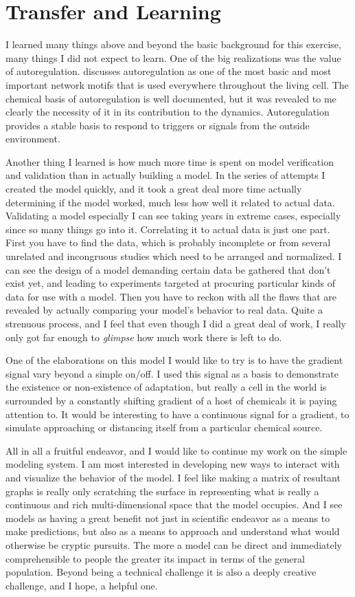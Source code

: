 \documentclass[12pt]{article}
\begin{document}
\section{Transfer and Learning}

I learned many things above and beyond the basic background for this exercise, many things I did not expect to learn.  One of the big realizations was the value of autoregulation.  \cite{Alon} discusses autoregulation as one of the most basic and most important network motifs that is used everywhere throughout the living cell.  The chemical basis of autoregulation is well documented, but it was revealed to me clearly the necessity of it in its contribution to the dynamics.  Autoregulation provides a stable basis to respond to triggers or signals from the outside environment.  

Another thing I learned is how much more time is spent on model verification and validation than in actually building a model.  In the series of attempts I created the model quickly, and it took a great deal more time actually determining if the model worked, much less how well it related to actual data.  Validating a model especially I can see taking years in extreme cases, especially since so many things go into it.  Correlating it to actual data is just one part.  First you have to find the data, which is probably incomplete or from several unrelated and incongruous studies which need to be arranged and normalized.  I can see the design of a model demanding certain data be gathered that don't exist yet, and leading to experiments targeted at procuring particular kinds of data for use with a model.  Then you have to reckon with all the flaws that are revealed by actually comparing your model's behavior to real data.  Quite a strenuous process, and I feel that even though I did a great deal of work, I really only got far enough to {\em glimpse} how much work there is left to do.  

One of the elaborations on this model I would like to try is to have the gradient signal vary beyond a simple on/off.  I used this signal as a basis to demonstrate the existence or non-existence of adaptation, but really a cell in the world is surrounded by a constantly shifting gradient of a host of chemicals it is paying attention to.  It would be interesting to have a continuous signal for a gradient, to simulate approaching or distancing itself from a particular chemical source.

All in all a fruitful endeavor, and I would like to continue my work on the simple modeling system.  I am most interested in developing new ways to interact with and visualize the behavior of the model.  I feel like making a matrix of resultant graphs is really only scratching the surface in representing what is really a continuous and rich multi-dimensional space that the model occupies.  And I see models as having a great benefit not just in scientific endeavor as a means to make predictions, but also as a means to approach and understand what would otherwise be cryptic pursuits.  The more a model can be direct and immediately comprehensible to people the greater its impact in terms of the general population.  Beyond being a technical challenge it is also a deeply creative challenge, and I hope, a helpful one.
\end{document}
